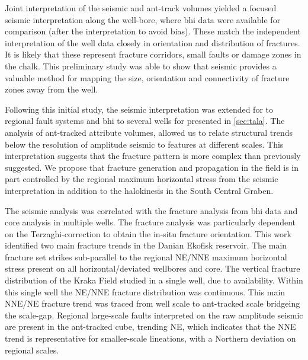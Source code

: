 Joint interpretation of the seismic and ant-track volumes yielded a focused seismic interpretation along the well-bore, where \acf{bhi} data were available for comparison (after the interpretation to avoid bias). These match the independent interpretation of the well data closely in orientation and distribution of fractures. It is likely that these represent fracture corridors, small faults or damage zones in the chalk. This preliminary study was able to show that seismic provides a valuable method for mapping the size, orientation and connectivity of fracture zones away from the well. 

Following this initial study, the seismic interpretation was extended for to regional fault systems and \ac{bhi} to several wells for \citet{aabo2018integrated} presented in \cref{sec:tala}. The analysis of ant-tracked attribute volumes, allowed us to relate structural trends below the resolution of amplitude seismic to features at different scales. This interpretation suggests that the fracture pattern is more complex than previously suggested. We propose that fracture generation and propagation in the field is in part controlled by the regional maximum horizontal stress from the seismic interpretation in addition to the halokinesis in the South Central Graben. 

The seismic analysis was correlated with the fracture analysis from \ac{bhi} data and core analysis in multiple wells. The fracture analysis was particularly dependent on the Terzaghi-correction \citep{terzaghi1965sources} to obtain the in-situ fracture orientation. This work identified two main fracture trends in the Danian Ekofisk reservoir. The main fracture set strikes sub-parallel to the regional NE/NNE maximum horizontal stress present on all horizontal/deviated wellbores and core. The vertical fracture distribution of the Kraka Field studied in a single well, due to availability. Within this single well the NE/NNE fracture distribution was continuous. This main NNE/NE fracture trend was traced from well scale to ant-tracked scale bridgeing the scale-gap. Regional large-scale faults interpreted on the raw amplitude seismic are present in the ant-tracked cube, trending NE, which indicates that the NNE trend is representative for smaller-scale lineations, with a Northern deviation on regional scales. 

